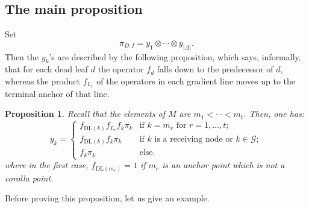 \documentclass[12pt]{amsart}
\numberwithin{equation}{section}
\newtheorem{prop}[thm]{Proposition}
\theoremstyle{definition}
\def\calG{\mathcal{G}} %
\def\DL{\mathrm{DL}}  %
\begin{document}
\subsection{The main proposition} 

Set 
\begin{equation} 
\pi_{D,I} = y_1 \otimes \cdots \otimes y_{\vert \Delta\vert} .
\end{equation} 
Then the $y_k$'s are described by the following proposition, which says, informally, that 
for each dead leaf $d$ the operator $f_d$ falls down to the predecessor of $d$, 
whereas the product $f_{L_r}$ of the operators in each gradient line moves up to the terminal anchor of that line. 


\begin{prop}\label{prop-1} Recall that the elements of $M$ are $m_1 < \cdots < m_t$. Then, one has: 
$$
y_k = 
\begin{cases} 
f_{\DL(k)} f_{L_r} f_k \pi_k & \text{if $k = m_r$ for } r = 1,\dots, t; 
\\
f_{\DL(k)} f_k \pi_k & \text{if $k$ is a receiving node or $k\in \calG$}; 
\\
 f_k \pi_k & \text{else}. 
\end{cases}
$$
where in the first case, $f_{\DL(m_r)} = 1$ if $m_r$ is an anchor point which is not a corolla point. 
\end{prop} 

Before proving this proposition, let us give an example. 
\end{document}
